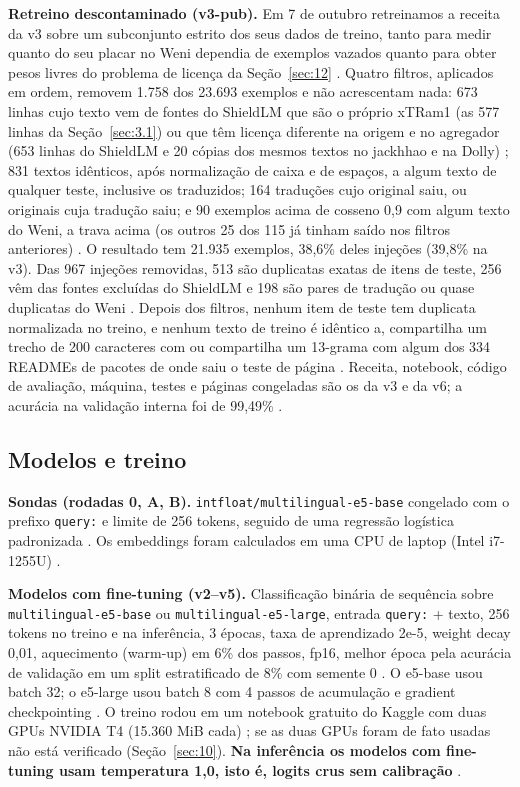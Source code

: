 \documentclass[11pt]{article}
\newcommand{\code}[1]{\texttt{#1}}
\begin{document}
\textbf{Retreino descontaminado (v3-pub).} Em 7 de outubro retreinamos a receita da v3 sobre um subconjunto estrito dos seus dados de treino, tanto para medir quanto do seu placar no Weni dependia de exemplos vazados quanto para obter pesos livres do problema de licença da Seção~\ref{sec:12}%
. Quatro filtros, aplicados em ordem, removem 1.758 dos 23.693 exemplos e não acrescentam nada: 673 linhas cujo texto vem de fontes do ShieldLM que são o próprio xTRam1 (as 577 linhas da Seção~\ref{sec:3.1}) ou que têm licença diferente na origem e no agregador (653 linhas do ShieldLM e 20 cópias dos mesmos textos no jackhhao e na Dolly)%
; 831 textos idênticos, após normalização de caixa e de espaços, a algum texto de qualquer teste, inclusive os traduzidos; 164 traduções cujo original saiu, ou originais cuja tradução saiu; e 90 exemplos acima de cosseno 0,9 com algum texto do Weni, a trava acima (os outros 25 dos 115 já tinham saído nos filtros anteriores)%
. O resultado tem 21.935 exemplos, 38,6\% deles injeções (39,8\% na v3). Das 967 injeções removidas, 513 são duplicatas exatas de itens de teste, 256 vêm das fontes excluídas do ShieldLM e 198 são pares de tradução ou quase duplicatas do Weni%
. Depois dos filtros, nenhum item de teste tem duplicata normalizada no treino, e nenhum texto de treino é idêntico a, compartilha um trecho de 200 caracteres com ou compartilha um 13-grama com algum dos 334 READMEs de pacotes de onde saiu o teste de página%
. Receita, notebook, código de avaliação, máquina, testes e páginas congeladas são os da v3 e da v6; a acurácia na validação interna foi de 99,49\%%
.

\subsection{Modelos e treino}\label{sec:3.5}

\textbf{Sondas (rodadas 0, A, B).} \code{intfloat/\allowbreak{}multilingual-\allowbreak{}e5-\allowbreak{}base} congelado \citep{wang2024multilinguale5, intfloat2023me5large} com o prefixo \code{query:\textvisiblespace{}} e limite de 256 tokens, seguido de uma regressão logística padronizada%
. Os embeddings foram calculados em uma CPU de laptop (Intel i7-1255U)%
.

\textbf{Modelos com fine-tuning (v2–v5).} Classificação binária de sequência sobre \code{multilingual-\allowbreak{}e5-\allowbreak{}base} ou \code{multilingual-\allowbreak{}e5-\allowbreak{}large}, entrada \code{query:\textvisiblespace{}} + texto, 256 tokens no treino e na inferência, 3 épocas, taxa de aprendizado 2e-5, weight decay 0,01, aquecimento (warm-up) em 6\% dos passos, fp16, melhor época pela acurácia de validação em um split estratificado de 8\% com semente 0%
. O e5-base usou batch 32; o e5-large usou batch 8 com 4 passos de acumulação e gradient checkpointing%
. O treino rodou em um notebook gratuito do Kaggle com duas GPUs NVIDIA T4 (15.360 MiB cada)%
; se as duas GPUs foram de fato usadas não está verificado (Seção~\ref{sec:10}). \textbf{Na inferência os modelos com fine-tuning usam temperatura 1,0, isto é, logits crus sem calibração}%
.
\end{document}
